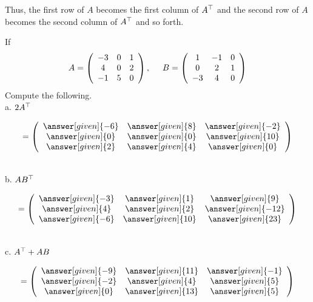 \documentclass{ximera}
\begin{document}
Thus, the first row of $A$ becomes the first column of $A^{\top}$ and the second row of $A$ becomes the second column of $A^{\top}$ and so forth. 
\begin{question}
If 
\[
A= \left(\begin{array}{ccc}
-3 & 0 & 1\\
4 & 0 & 2\\
-1 & 5 & 0
\end{array}\right), \hspace{.5cm}
B = \left(\begin{array}{ccc}
1 & -1 & 0\\
0 & 2 & 1\\
-3 & 4 & 0
\end{array}\right)\]
Compute the following. \\

a. $2A^{\top}$ \begin{prompt} \[= \left(\begin{array}{ccc}
\answer[given]{-6} & \answer[given]{8}& \answer[given]{-2}\\
\answer[given]{0} & \answer[given]{0}& \answer[given]{10}\\
\answer[given]{2} & \answer[given]{4}& \answer[given]{0}
\end{array}\right)\]\end{prompt}\\

b. $AB^{\top}$ \begin{prompt} \[= \left(\begin{array}{ccc}
\answer[given]{-3} & \answer[given]{1}& \answer[given]{9}\\
\answer[given]{4} & \answer[given]{2}& \answer[given]{-12}\\
\answer[given]{-6} & \answer[given]{10}& \answer[given]{23}
\end{array}\right)\]\end{prompt}\\

c. $A^{\top} + AB$ \begin{prompt} \[=\left(\begin{array}{ccc}
\answer[given]{-9} & \answer[given]{11}& \answer[given]{-1}\\
\answer[given]{-2} & \answer[given]{4}& \answer[given]{5}\\
\answer[given]{0} & \answer[given]{13}& \answer[given]{5}
\end{array}\right)\]\end{prompt}
\end{question}
\end{document}
